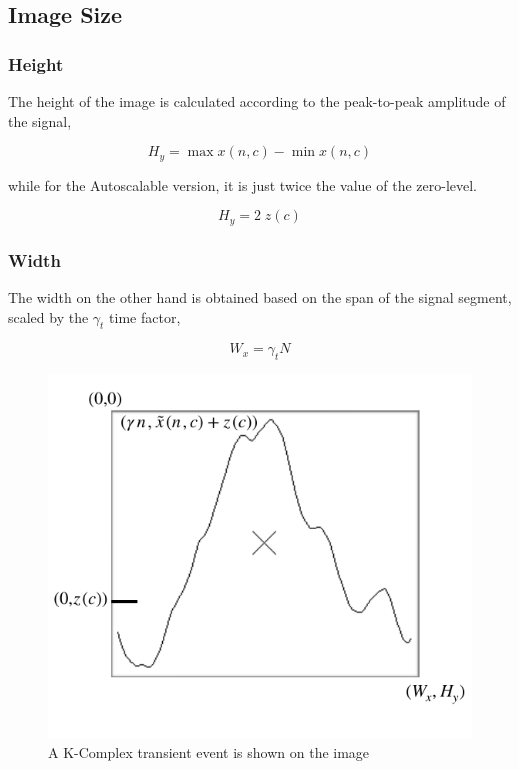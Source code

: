 \subsection{Image Size}

\subsubsection{Height}

The height of the image is calculated according to the peak-to-peak amplitude of the signal,

\begin{equation}
H_y = \max x(n,c) - \min x(n,c)
\label{eq:standarizedaverages}
\end{equation}

\noindent while for the Autoscalable version, it is just twice the value of the zero-level.

\begin{equation}
H_y = 2 \; z(c)
\label{eq:autoscaleheight}
\end{equation}


\subsubsection{Width}

The width on the other hand is obtained based on the span of the signal segment, scaled by the $\gamma_t$  time factor,

\begin{equation}
W_x = \gamma_t  N
\label{eq:standarizedaverages}
\end{equation}

\begin{figure}[]
\centering
\includegraphics[scale=1]{images/imagecoordinatesystem.pdf}
\caption[Image Coordinate System]{A K-Complex transient event is shown on the image }
\label{fig:imagecoordinatesystem}
\end{figure}

